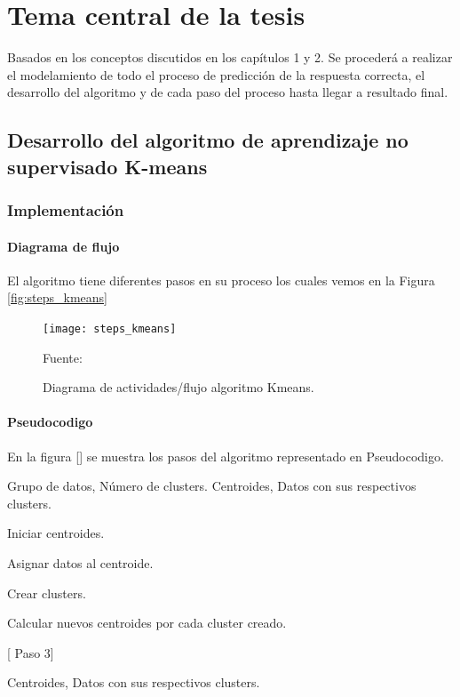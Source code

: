\chapter{Tema central de la tesis}

Basados en los conceptos discutidos en los capítulos 1 y 2. Se procederá a realizar el modelamiento de todo el proceso de predicción de la respuesta correcta, el desarrollo del algoritmo y de cada paso del proceso hasta llegar a resultado final.

\section{Desarrollo del algoritmo de aprendizaje no supervisado K-means} 

\subsection{Implementación}

\subsubsection{Diagrama de flujo}

El algoritmo tiene diferentes pasos en su proceso los cuales vemos en la Figura \ref{fig:steps_kmeans}

\begin{figure}[ht]
	\begin{center}
		\texttt{[image: steps\_kmeans]}
	\end{center}
	\begin{center}
		\vskip -0.5cm
		\caption{\small{Diagrama de actividades/flujo algoritmo Kmeans.}}
		{\small{Fuente: }}
	\end{center}
\end{figure}

\subsubsection{Pseudocodigo}
En la figura [] se muestra los pasos del algoritmo representado en Pseudocodigo.

\begin{algorithm}
\begin{algorithmic}[1]
		\REQUIRE Grupo de datos, Número de clusters.  %
		\label{lin:algorithm_kmeans}
		\ENSURE Centroides, Datos con sus respectivos clusters.                                                       %
		
		\STATE Iniciar centroides.
					
		\STATE Asignar datos al centroide. \label{marker}
			
		\STATE Crear clusters.
			
		\STATE Calcular nuevos centroides por cada cluster creado.
			
			 [ Paso 3]
		\ENDIF
			
		\RETURN  Centroides, Datos con sus respectivos clusters.
		
\end{algorithmic}
\end{algorithm}


